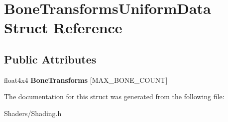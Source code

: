 \hypertarget{structBoneTransformsUniformData}{}\section{Bone\+Transforms\+Uniform\+Data Struct Reference}
\label{structBoneTransformsUniformData}
\subsection*{Public Attributes}
\begin{DoxyCompactItemize}
\item 
\mbox{\label{structBoneTransformsUniformData_a829bcf868620ce499045a9f47c487c99}} 
float4x4 {\bfseries Bone\+Transforms} \mbox{[}M\+A\+X\+\_\+\+B\+O\+N\+E\+\_\+\+C\+O\+U\+NT\mbox{]}
\end{DoxyCompactItemize}


The documentation for this struct was generated from the following file\+:\begin{DoxyCompactItemize}
\item 
Shaders/Shading.\+h\end{DoxyCompactItemize}
